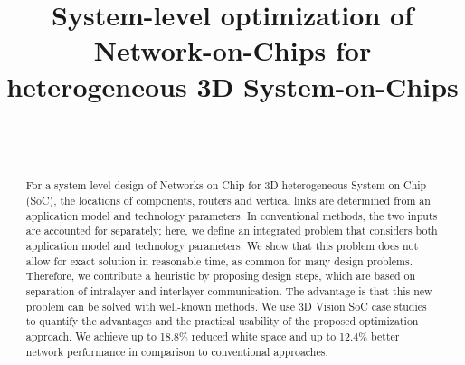 \documentclass[letter, 10pt, conference]{IEEEtran}
\begin{document}
\title{System-level optimization of Network-on-Chips for heterogeneous 3D System-on-Chips\vspace{-12pt}}

\author{
	\\\vspace{-12pt}
	\\
	}



\maketitle
\begin{abstract}
	For a system-level design of Networks-on-Chip for 3D heterogeneous System-on-Chip (SoC), the locations of components, routers and vertical links are determined from an application model and technology parameters. In conventional methods, the two inputs are accounted for separately; here, we define an integrated problem that considers both application model and technology parameters. We show that this problem does not allow for exact solution in reasonable time, as common for many design problems. Therefore, we contribute a heuristic by proposing design steps, which are based on separation of intralayer and interlayer communication. The advantage is that this new problem can be solved with well-known methods. We use 3D Vision SoC case studies to quantify the advantages and the practical usability of the proposed optimization approach. We achieve up to 18.8\% reduced white space and up to 12.4\% better network performance in comparison to conventional approaches.
\end{abstract}

\end{document}
